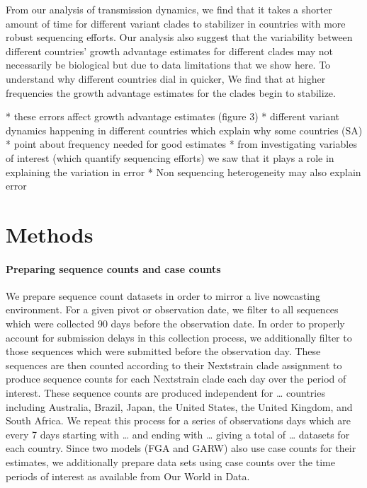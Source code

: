 \documentclass[11pt,oneside,letterpaper]{article}
\begin{document}

From our analysis of transmission dynamics, we find that it takes a shorter amount of time for different variant clades to stabilizer in countries with more robust sequencing efforts. 
Our analysis also suggest that the variability between different countries' growth advantage estimates for different clades may not necessarily be biological but due to data limitations that we show here.
To understand why different countries dial in quicker, We find that at higher frequencies the growth advantage estimates for the clades begin to stabilize. 

* these errors affect growth advantage estimates  (figure 3)
* different variant dynamics happening in different countries which explain why some countries (SA)
* point about frequency needed for good estimates
* from investigating variables of interest (which quantify sequencing efforts) we saw that it plays a role in explaining the variation in error
* Non sequencing heterogeneity may also explain error



\section*{Methods}

\paragraph{Preparing sequence counts and case counts}

We prepare sequence count datasets in order to mirror a live nowcasting environment. 
For a given pivot or observation date, we filter to all sequences which were collected 90 days before the observation date. 
In order to properly account for submission delays in this collection process, we additionally filter to those sequences which were submitted before the observation day.
These sequences are then counted according to their Nextstrain clade assignment to produce sequence counts for each Nextstrain clade each day over the period of interest. 
These sequence counts are produced independent for … countries including Australia, Brazil, Japan, the United States, the United Kingdom, and South Africa.
We repeat this process for a series of observations days which are every 7 days starting with … and ending with … giving a total of … datasets for each country.
Since two models (FGA and GARW) also use case counts for their estimates, we additionally prepare data sets using case counts over the time periods of interest as available from Our World in Data.
\end{document}
